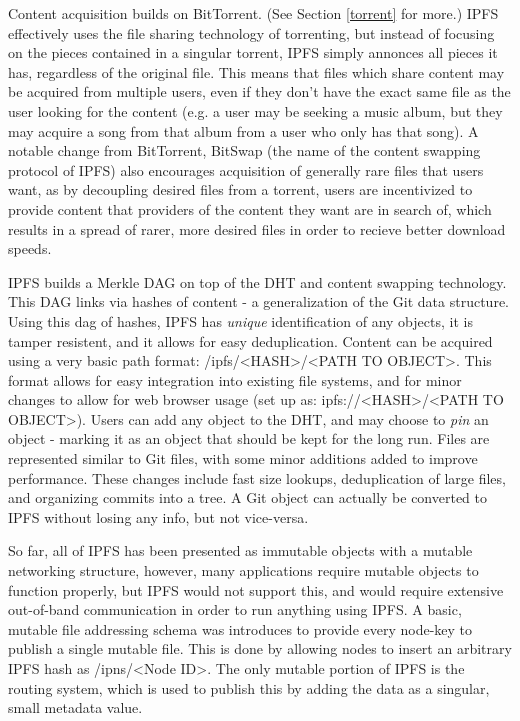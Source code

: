 \documentclass[12pt]{report}
\begin{document}
Content acquisition builds on BitTorrent. (See Section \ref{torrent} for more.) IPFS effectively uses the file sharing technology of torrenting, but instead of focusing on the pieces contained in a singular torrent, IPFS simply annonces all pieces it has, regardless of the original file. This means that files which share content may be acquired from multiple users, even if they don't have the exact same file as the user looking for the content (e.g. a user may be seeking a music album, but they may acquire a song from that album from a user who only has that song). A notable change from BitTorrent, BitSwap (the name of the content swapping protocol of IPFS) also encourages acquisition of generally rare files that users want, as by decoupling desired files from a torrent, users are incentivized to provide content that providers of the content they want are in search of, which results in a spread of rarer, more desired files in order to recieve better download speeds.\cite{ipfs}

IPFS builds a Merkle DAG on top of the DHT and content swapping technology. This DAG links via hashes of content - a generalization of the Git data structure.\cite{ipfs} Using this dag of hashes, IPFS has \emph{unique} identification of any objects, it is tamper resistent, and it allows for easy deduplication.\cite{ipfs} Content can be acquired using a very basic path format: /ipfs/<HASH>/<PATH TO OBJECT>. This format allows for easy integration into existing file systems, and for minor changes to allow for web browser usage (set up as: ipfs://<HASH>/<PATH TO OBJECT>). Users can add any object to the DHT, and may choose to \emph{pin} an object - marking it as an object that should be kept for the long run. Files are represented similar to Git files, with some minor additions added to improve performance. These changes include fast size lookups, deduplication of large files, and organizing commits into a tree.\cite{ipfs} A Git object can actually be converted to IPFS without losing any info, but not vice-versa.

So far, all of IPFS has been presented as immutable objects with a mutable networking structure, however, many applications require mutable objects to function properly, but IPFS would not support this, and would require extensive out-of-band communication in order to run anything using IPFS. A basic, mutable file addressing schema was introduces to provide every node-key to publish a single mutable file. This is done by allowing nodes to insert an arbitrary IPFS hash as /ipns/<Node ID>. The only mutable portion of IPFS is the routing system, which is used to publish this by adding the data as a singular, small metadata value.\cite{ipfs}
\end{document}
